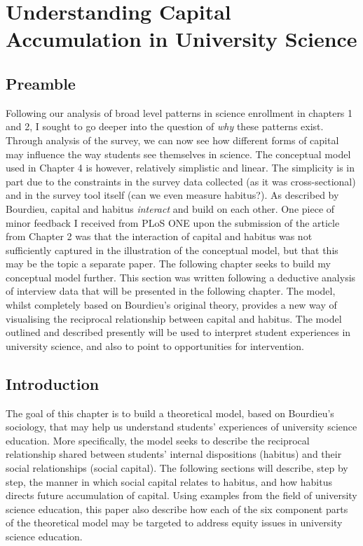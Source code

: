 \chapter{Understanding Capital Accumulation in University Science}

\section{Preamble}
Following our analysis of broad level patterns in science enrollment in chapters 1 and 2, I sought to go deeper into the question of \textit{why} these patterns exist. Through analysis of the survey, we can now see how different forms of capital may influence the way students see themselves in science. The conceptual model used in Chapter 4 is however, relatively simplistic and linear. The simplicity is in part due to the constraints in the survey data collected (as it was cross-sectional) and in the survey tool itself (can we even measure habitus?). As described by Bourdieu, capital and habitus \textit{interact} and build on each other. One piece of minor feedback I received from PLoS ONE upon the submission of the article from Chapter 2 was that the interaction of capital and habitus was not sufficiently captured in the illustration of the conceptual model, but that this may be the topic a separate paper. The following chapter seeks to build my conceptual model further. This section was written following a deductive analysis of interview data that will be presented in the following chapter. The model, whilst completely based on Bourdieu's original theory, provides a new way of visualising the reciprocal relationship between capital and habitus. The model outlined and described presently will be used to interpret student experiences in university science, and also to point to opportunities for intervention. 


\section{Introduction}
The goal of this chapter is to build a theoretical model, based on Bourdieu's sociology, that may help us understand students' experiences of university science education. More specifically, the model seeks to describe the reciprocal relationship shared between students' internal dispositions (habitus) and their social relationships (social capital). The following sections will describe, step by step, the manner in which social capital relates to habitus, and how habitus directs future accumulation of capital. Using examples from the field of university science education, this paper also describe how each of the six component parts of the theoretical model may be targeted to address equity issues in university science education.

